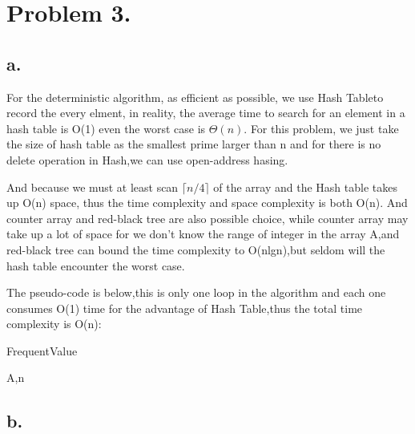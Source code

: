 \documentclass[oneside]{homework} %
\begin{document}
\maketitle
\newpage

\section*{Problem 3.}
\subsection*{a.}
For the deterministic algorithm, as efficient as possible, we use Hash Table\footnotemark[3] to record the every elment, in reality, the average time to search for an element in a hash table is O(1) even the worst case is $\Theta(n)$. For this problem, we just take the size of hash table as the smallest prime larger than n and for there is no delete operation in Hash,we can use open-address hasing. 

And because we must at least scan $\lceil n/4 \rceil$ of the array and the Hash table takes up O(n) space, thus the time complexity and space complexity is both O(n).
And counter array and red-black tree are also possible choice, while counter array may take up a lot of space for we don't know the range of integer in the array A,and red-black tree can bound the time complexity to O(nlgn),but seldom will the hash table encounter the worst case.


The pseudo-code is below,this is only one loop in the algorithm and each one consumes O(1) time for the advantage of Hash Table,thus the total time complexity is O(n):

\begin{algorithm}[h]
  \caption{FrequentValue}
  \label{algo:fv}
  \begin{algorithmic}[1]
	\REQUIRE A,n
	\ENSURE ~ ~\\ 
	  \ENDIF
	\ENDFOR
  \end{algorithmic}
\end{algorithm} 

\subsection*{b.}
\end{document}

